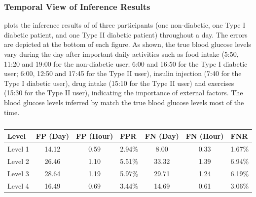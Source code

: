\subsubsection{Temporal View of Inference Results}
\label{subsec:Inference_Results}
 plots the inference results of \sysname of three participants (one non-diabetic, one Type I diabetic patient, and one Type II diabetic patient) throughout a day.
The errors are depicted at the bottom of each figure.
As shown, the true blood glucose levels vary during the day after important daily activities such as food intake (5:50, 11:20 and 19:00 for the non-diabetic user; 6:00 and 16:50 for the Type I diabetic user; 6:00, 12:50 and 17:45 for the Type II user), insulin injection (7:40 for the Type I diabetic user), drug intake (15:10 for the Type II user) and exercises (15:30 for the Type II user), indicating the importance of external factors.
The blood glucose levels inferred by \sysname match the true blood glucose levels most of the time.

\begin{table}[h]
  \centering
  \small
  \caption{}
  \label{tab:fpfn}
  \begin{tabular}{|l|c|c|c|c|c|c|}
  \hline
  \textbf{Level} & \multicolumn{1}{l|}{\textbf{FP (Day)}} & \multicolumn{1}{l|}{\textbf{FP (Hour)}} & \multicolumn{1}{l|}{\textbf{FPR}} & \multicolumn{1}{l|}{\textbf{FN (Day)}} & \multicolumn{1}{l|}{\textbf{FN (Hour)}} & \multicolumn{1}{l|}{\textbf{FNR}}
  \\ \hline
  Level 1 & 14.12 & 0.59 & 2.94\% & 8.00 & 0.33 & 1.67\% \\ \hline
  Level 2 & 26.46 & 1.10 & 5.51\% & 33.32 & 1.39 & 6.94\% \\ \hline
  Level 3 & 28.64 & 1.19 & 5.97\% & 29.71 & 1.24 & 6.19\% \\ \hline
  Level 4 & 16.49 & 0.69 & 3.44\% & 14.69 & 0.61 & 3.06\% \\ \hline
\end{tabular}
\end{table}


